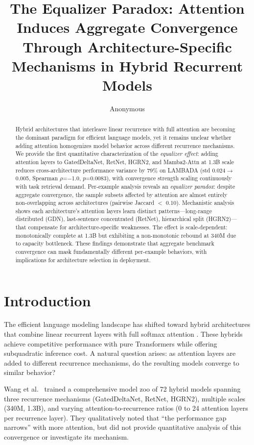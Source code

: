 \documentclass[11pt,twocolumn,a4paper]{article}
\title{The Equalizer Paradox: Attention Induces Aggregate Convergence Through Architecture-Specific Mechanisms in Hybrid Recurrent Models}
\author{Anonymous}
\date{}
\begin{document}
\maketitle

\begin{abstract}
Hybrid architectures that interleave linear recurrence with full attention are becoming the dominant paradigm for efficient language models, yet it remains unclear whether adding attention homogenizes model behavior across different recurrence mechanisms. We provide the first quantitative characterization of the \emph{equalizer effect}: adding attention layers to GatedDeltaNet, RetNet, HGRN2, and Mamba2-Attn at 1.3B scale reduces cross-architecture performance variance by 79\% on LAMBADA (std 0.024$\to$0.005, Spearman $\rho$=$-$1.0, $p$=0.0083), with convergence strength scaling continuously with task retrieval demand. Per-example analysis reveals an \emph{equalizer paradox}: despite aggregate convergence, the sample subsets affected by attention are almost entirely non-overlapping across architectures (pairwise Jaccard $<$ 0.10). Mechanistic analysis shows each architecture's attention layers learn distinct patterns---long-range distributed (GDN), last-sentence concentrated (RetNet), hierarchical split (HGRN2)---that compensate for architecture-specific weaknesses. The effect is scale-dependent: monotonically complete at 1.3B but exhibiting a non-monotonic rebound at 340M due to capacity bottleneck. These findings demonstrate that aggregate benchmark convergence can mask fundamentally different per-example behaviors, with implications for architecture selection in deployment.
\end{abstract}

\section{Introduction}

The efficient language modeling landscape has shifted toward hybrid architectures that combine linear recurrent layers with full softmax attention \cite{wang2025mamba,de2024griffin,dao2024transformers}. These hybrids achieve competitive performance with pure Transformers while offering subquadratic inference cost. A natural question arises: as attention layers are added to different recurrence mechanisms, do the resulting models converge to similar behavior?

Wang et al.\ \cite{wang2025mamba} trained a comprehensive model zoo of 72 hybrid models spanning three recurrence mechanisms (GatedDeltaNet, RetNet, HGRN2), multiple scales (340M, 1.3B), and varying attention-to-recurrence ratios (0 to 24 attention layers per recurrence layer). They qualitatively noted that ``the performance gap narrows'' with more attention, but did not provide quantitative analysis of this convergence or investigate its mechanism.
\end{document}
